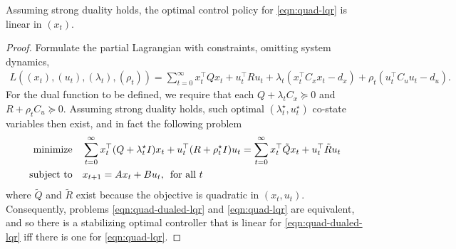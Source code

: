 \documentclass[12pt]{article}
\begin{document}
\begin{theorem}
  Assuming strong duality holds,
  the optimal control policy for \eqref{eqn:quad-lqr} is linear in \((x_t)\).
\end{theorem}
\begin{proof}
  Formulate the partial Lagrangian with constraints, omitting system dynamics,
  \begin{align*}
    L((x_t), (u_t), (\lambda_t), (\rho_t))
      = \sum_{t = 0}^{\infty}
        x_t ^\top Q x_t + u_t ^\top R u_t
        + \lambda_t (x_t ^\top C_x x_t - d_x)
        + \rho_t (u_t ^\top C_u u_t - d_u).
  \end{align*}
  For the dual function to be defined, we require that each
  \(Q + \lambda_t C_x \succeq 0\) and
  \(R + \rho_t C_u \succeq 0\).
  Assuming strong duality holds, such optimal
  \((\lambda_t ^\star, u_t ^\star)\) co-state variables then exist,
  and in fact the following problem
  \begin{align}
    \text{minimize} &\quad \sum_{t = 0}^{\infty}
        x_t ^\top (Q + \lambda_t ^\star I) x_t
        + u_t ^\top (R + \rho_t ^\star I) u_t
      = \sum_{t = 0}^{\infty}
        x_t ^\top \tilde{Q} x_t + u_t ^\top \tilde{R} u_t
      \label{eqn:quad-dualed-lqr} \\
    \text{subject to}
      &\quad x_{t + 1} = A x_t + B u_t, \enskip \text{for all \(t\)} \nonumber
  \end{align}
  where \(\tilde{Q}\) and \(\tilde{R}\) exist because
  the objective is quadratic in \((x_t, u_t)\).
  Consequently, problems \eqref{eqn:quad-dualed-lqr} and \eqref{eqn:quad-lqr}
  are equivalent,
  and so there is a stabilizing optimal controller that is linear
  for \eqref{eqn:quad-dualed-lqr} iff there is one
  for \eqref{eqn:quad-lqr}.
\end{proof}


\printbibliography
\end{document}
